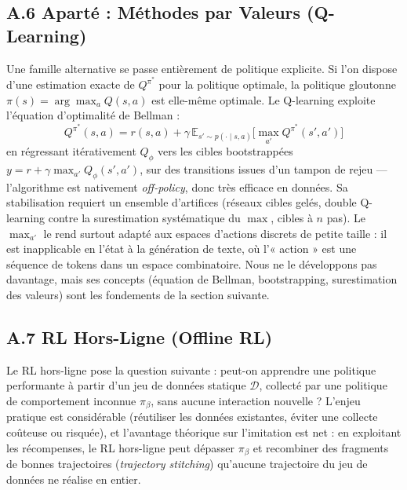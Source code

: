 \documentclass[11pt,a4paper]{article}
\begin{document}
\subsection*{A.6 Aparté : Méthodes par Valeurs (Q-Learning)}
Une famille alternative se passe entièrement de politique explicite. Si l'on dispose d'une estimation exacte de $Q^{\pi^*}$ pour la politique optimale, la politique gloutonne $\pi(s) = \arg\max_a Q(s, a)$ est elle-même optimale. Le Q-learning exploite l'équation d'optimalité de Bellman :
\begin{equation}
Q^{\pi^*}(s, a) = r(s, a) + \gamma \, \mathbb{E}_{s' \sim p(\cdot \mid s, a)} \Big[ \max_{a'} Q^{\pi^*}(s', a') \Big]
\end{equation}
en régressant itérativement $Q_\phi$ vers les cibles bootstrappées $y = r + \gamma \max_{a'} Q_\phi(s', a')$, sur des transitions issues d'un tampon de rejeu — l'algorithme est nativement \emph{off-policy}, donc très efficace en données. Sa stabilisation requiert un ensemble d'artifices (réseaux cibles gelés, double Q-learning contre la surestimation systématique du $\max$, cibles à $n$ pas). Le $\max_{a'}$ le rend surtout adapté aux espaces d'actions discrets de petite taille : il est inapplicable en l'état à la génération de texte, où l'« action » est une séquence de tokens dans un espace combinatoire. Nous ne le développons pas davantage, mais ses concepts (équation de Bellman, bootstrapping, surestimation des valeurs) sont les fondements de la section suivante.

\subsection*{A.7 RL Hors-Ligne (Offline RL)}
Le RL hors-ligne pose la question suivante : peut-on apprendre une politique performante à partir d'un jeu de données statique $\mathcal{D}$, collecté par une politique de comportement inconnue $\pi_\beta$, sans aucune interaction nouvelle ? L'enjeu pratique est considérable (réutiliser les données existantes, éviter une collecte coûteuse ou risquée), et l'avantage théorique sur l'imitation est net : en exploitant les récompenses, le RL hors-ligne peut dépasser $\pi_\beta$ et recombiner des fragments de bonnes trajectoires (\emph{trajectory stitching}) qu'aucune trajectoire du jeu de données ne réalise en entier.
\end{document}
